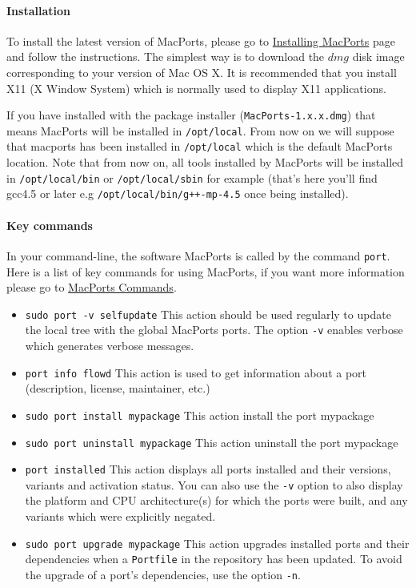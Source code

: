 \paragraph{Installation}
To install the latest version of MacPorts, please go to
\href{http://www.macports.org/install.php}{Installing MacPorts} page and follow
the instructions. The simplest way is to download the $dmg$ disk image
corresponding to your version of Mac OS X. It is recommended that you install
X11 (X Window System) which is normally used to display X11
applications.%

If you have installed with the package installer
(\lstinline|MacPorts-1.x.x.dmg|) that means MacPorts will be installed in
\lstinline|/opt/local|. From now on we will suppose that macports has been
installed in \lstinline|/opt/local| which is the default MacPorts location. Note
that from now on, all tools installed by MacPorts will be installed in
\lstinline!/opt/local/bin! or \lstinline!/opt/local/sbin! for example (that's
here you'll find gcc4.5 or later e.g \lstinline!/opt/local/bin/g++-mp-4.5! once being
installed).%

\paragraph{Key commands}
In your command-line, the software MacPorts is called by the command \lstinline|port|.
Here is a list of key commands for using MacPorts, if you want more information please go to \href{http://guide.macports.org/#using.port}{MacPorts Commands}.
\begin{itemize}
\item \lstinline|sudo port -v selfupdate|
	This action should be used regularly to update the local tree with the global MacPorts ports. The option \lstinline|-v| enables verbose which generates verbose messages.
\item \lstinline|port info flowd|
	This action is used to get information about a port (description, license, maintainer, etc.)
\item \lstinline|sudo port install mypackage|
	This action install the port mypackage
\item \lstinline|sudo port uninstall mypackage|
	This action uninstall the port mypackage
\item \lstinline|port installed|
	This action displays all ports installed and their versions, variants and activation status. You can also use the \lstinline|-v| option to also display the platform and CPU architecture(s) for which the ports were built, and any variants which were explicitly negated.
\item \lstinline|sudo port upgrade mypackage|
	This action upgrades installed ports and their dependencies when a \lstinline|Portfile| in the repository has been updated. To avoid the upgrade of a port's dependencies, use the option \lstinline|-n|.
\end{itemize}

